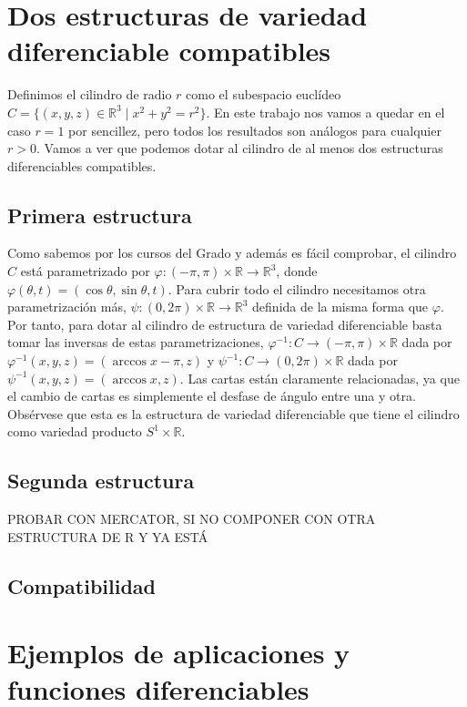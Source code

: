 \documentclass[twoside, 11pt]{article}
\theoremstyle{definition}
\newcommand{\R}{\mathbb{R}}
\begin{document}
\newpage

\section{Dos estructuras de variedad diferenciable compatibles}

Definimos el cilindro de radio $r$ como el subespacio euclídeo $C=\{(x,y,z)\in\R^3\mid x^2+y^2=r^2\}$. En este trabajo nos vamos a quedar en el caso $r=1$ por sencillez, pero todos los resultados son análogos para cualquier $r>0$. Vamos a ver que podemos dotar al cilindro de al menos dos estructuras diferenciables compatibles. 

\subsection{Primera estructura}
Como sabemos por los cursos del Grado y además es fácil comprobar, el cilindro $C$ está parametrizado por $\varphi:(-\pi,\pi)\times\R\to \R^3$, donde $\varphi(\theta,t)=(\cos\theta,\sin\theta, t)$. Para cubrir todo el cilindro necesitamos otra parametrización más, $\psi:(0,2\pi)\times\R\to\R^3$ definida de la misma forma que $\varphi$. Por tanto, para dotar al cilindro de estructura de variedad diferenciable basta tomar las inversas de estas parametrizaciones, $\varphi^{-1}:C\to(-\pi,\pi)\times\R$ dada por $\varphi^{-1}(x,y,z)=(\arccos x-\pi, z)$ y $\psi^{-1}:C\to(0,2\pi)\times\R$ dada por $\psi^{-1}(x,y,z)=(\arccos x, z)$. Las cartas están claramente relacionadas, ya que el cambio de cartas es simplemente el desfase de ángulo entre una y otra. Obsérvese que esta es la estructura de variedad diferenciable que tiene el cilindro como variedad producto $S^1\times \R$. 

\subsection{Segunda estructura}
PROBAR CON MERCATOR, SI NO COMPONER CON OTRA ESTRUCTURA DE R Y YA ESTÁ

\subsection{Compatibilidad}

\section{Ejemplos de aplicaciones y funciones diferenciables}
\end{document}
